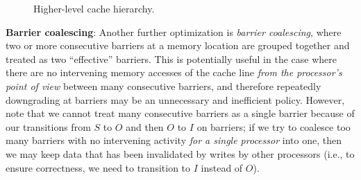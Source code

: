 \documentclass{article}
\begin{document}
\begin{figure}[H]
\begin{center}
\end{center}
\caption{Higher-level cache hierarchy.}
\label{multi-hierarchy}
\end{figure}

\textbf{Barrier coalescing}: Another further optimization is \textit{barrier coalescing}, where two or more consecutive barriers at a memory location are grouped together and treated as two ``effective'' barriers. This is potentially useful in the case where there are no intervening memory accesses of the cache line \textit{from the processor's point of view} between many consecutive barriers, and therefore repeatedly downgrading at barriers may be an unnecessary and inefficient policy. However, note that we cannot treat many consecutive barriers as a single barrier because of our transitions from $S$ to $O$ and then $O$ to $I$ on barriers; if we try to coalesce too many barriers with no intervening activity \textit{for a single processor} into one, then we may keep data that has been invalidated by writes by other processors (i.e., to ensure correctness, we need to transition to $I$ instead of $O$).

\printbibliography
\end{document}
